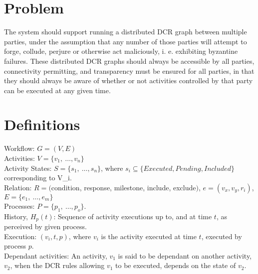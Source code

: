 \documentclass{article}
\begin{document}
	\section*{Problem}
	The system should support running a distributed DCR graph between multiple parties, under the assumption that any number of those parties will attempt to forge, collude, perjure or otherwise act maliciously, i. e. exhibiting byzantine failures.
	These distributed DCR graphs should always be accessible by all parties, connectivity permitting, and transparency must be ensured for all parties, in that they should always be aware of whether or not activities controlled by that party can be executed at any given time.


	\section*{Definitions}
	\noindent
	Workflow: $G=(V,E)$ \\
	Activities: $V=\{v_1,\ \dots, v_n\}$ \\
	Activity States: $S=\{s_1,\ \dots, s_n\}$, where $s_i \subseteq \{Executed, Pending, Included\}$ corresponding to V_i.\\
	Relation: $R=($condition, response, milestone, include, exclude$)$, $e=(v_x, v_y, r_i)$, $E=\{e_1,\ \dots, e_m\}$\\
	Processes: $P =\{p_1,\ \dots, p_o\}$.\\
	History, $H_p(t)$: Sequence of activity executions up to, and at time $t$, as perceived by given process.\\
	Execution: $(v_i, t, p)$, where $v_i$ is the activity executed at time $t$, executed by process $p$.\\
	Dependant activities: An activity, $v_1$ is said to be dependant on another activity, $v_2$, when the DCR rules allowing $v_1$ to be executed, depends on the state of $v_2$. \\
\end{document}
